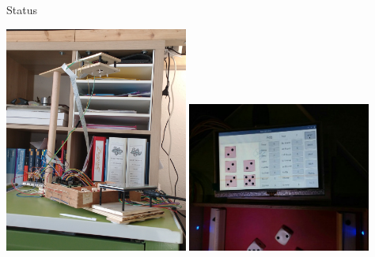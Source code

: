 \documentclass{beamer}
\begin{document}
\begin{frame}{Status}

\begin{center}
    \includegraphics[width=0.45\textwidth]{fig_kniffelbot_3}
    \includegraphics[width=0.45\textwidth]{fig_kniffelbot_4}
\end{center}

\end{frame}
\end{document}
